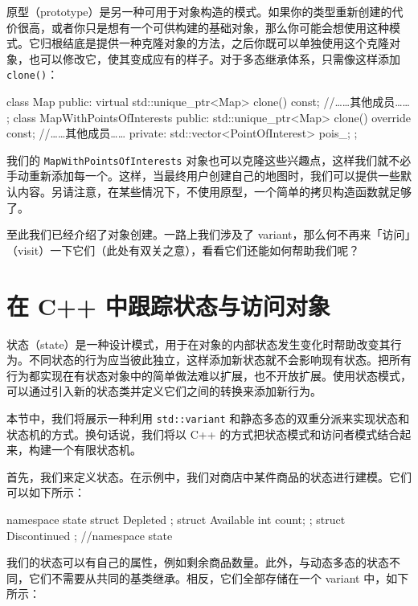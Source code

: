 \label{idx:587}
原型（prototype）是另一种可用于对象构造的模式。如果你的类型重新创建的代价很高，或者你只是想有一个可供构建的基础对象，那么你可能会想使用这种模式。它归根结底是提供一种克隆对象的方法，之后你既可以单独使用这个克隆对象，也可以修改它，使其变成应有的样子。对于多态继承体系，只需像这样添加 \texttt{clone()}：

\begin{codebox}[cpp]
class Map {
public:
    virtual std::unique_ptr<Map> clone() const;
    //……其他成员……
};
class MapWithPointsOfInterests {
public:
    std::unique_ptr<Map> clone() override const;
    //……其他成员……
private:
    std::vector<PointOfInterest> pois_;
};
\end{codebox}

我们的 \texttt{Map\allowbreak{}With\allowbreak{}Points\allowbreak{}Of\allowbreak{}Interests} 对象也可以克隆这些兴趣点，这样我们就不必手动重新添加每一个。这样，当最终用户创建自己的地图时，我们可以提供一些默认内容。另请注意，在某些情况下，不使用原型，一个简单的拷贝构造函数就足够了。

至此我们已经介绍了对象创建。一路上我们涉及了 variant，那么何不再来「访问」（visit）一下它们（此处有双关之意），看看它们还能如何帮助我们呢？

\section{在 C++ 中跟踪状态与访问对象}

\label{idx:588}
状态（state）是一种设计模式，用于在对象的内部状态发生变化时帮助改变其行为。不同状态的行为应当彼此独立，这样添加新状态就不会影响现有状态。把所有行为都实现在有状态对象中的简单做法难以扩展，也不开放扩展。使用状态模式，可以通过引入新的状态类并定义它们之间的转换来添加新行为。

本节中，我们将展示一种利用 \texttt{std::\allowbreak{}variant} 和静态多态的双重分派来实现状态和状态机的方式。换句话说，我们将以 C++ 的方式把状态模式和访问者模式结合起来，构建一个有限状态机。


\label{idx:589}
首先，我们来定义状态。在示例中，我们对商店中某件商品的状态进行建模。它们可以如下所示：

\begin{codebox}[cpp]
namespace state {
struct Depleted {};
struct Available {
    int count;
};
struct Discontinued {};
} //namespace state
\end{codebox}

\label{idx:590}
我们的状态可以有自己的属性，例如剩余商品数量。此外，与动态多态的状态不同，它们不需要从共同的基类继承。相反，它们全部存储在一个 variant 中，如下所示：

